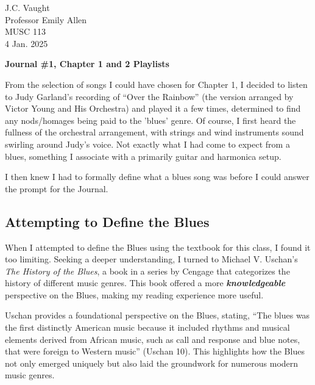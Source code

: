 \documentclass[12pt]{article}
\begin{document}
\noindent
J.C. Vaught \\
Professor Emily Allen \\
MUSC 113 \\
4 Jan. 2025 \\

\vspace{0.5in}

\begin{center}
\textbf{Journal \#1, Chapter 1 and 2 Playlists}
\end{center}

\vspace{0.5in}

From the selection of songs I could have chosen for Chapter 1, I decided to listen to Judy Garland’s recording of “Over the Rainbow” (the version arranged by Victor Young and His Orchestra) and played it a few times, determined to find any nods/homages being paid to the 'blues' genre. Of course, I first heard the fullness of the orchestral arrangement, with strings and wind instruments sound swirling around Judy’s voice. Not exactly what I had come to expect from a blues, something I associate with a primarily guitar and harmonica setup.

I then knew I had to formally define what a blues song was before I could answer the prompt for the Journal.

\subsection*{Attempting to Define the Blues}

When I attempted to define the Blues using the textbook for this class, I found it too limiting. Seeking a deeper understanding, I turned to Michael V. Uschan’s \textit{The History of the Blues}, a book in a series by Cengage that categorizes the history of different music genres. This book offered a more \textit{\textbf{knowledgeable}} perspective on the Blues, making my reading experience more useful.

Uschan provides a foundational perspective on the Blues, stating, “The blues was the first distinctly American music because it included rhythms and musical elements derived from African music, such as call and response and blue notes, that were foreign to Western music” (Uschan 10). This highlights how the Blues not only emerged uniquely but also laid the groundwork for numerous modern music genres.
\end{document}
